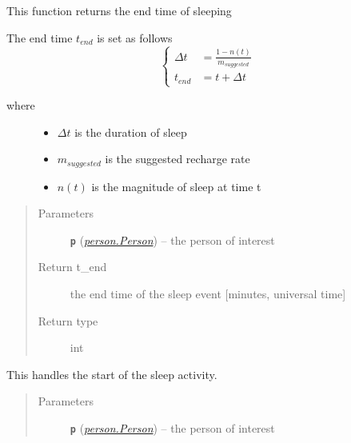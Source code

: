 \documentclass[letterpaper,10pt,english]{sphinxmanual}
\begin{document}
\begin{fulllineitems}
\begin{fulllineitems}
\begin{quote}
\begin{description}
\end{description}\end{quote}

\end{fulllineitems}


\begin{fulllineitems}
\label{sleep:sleep.Sleep.set_end_time}
This function returns the end time of sleeping

The end time \(t_{end}\) is set as follows
\[
\begin{cases}
    \Delta{t} &= \frac{ 1 - n(t) }{ m_{suggested} } \\
    t_{end} &= t + \Delta{t}
\end{cases}
\]\begin{description}
\item[{where}] \leavevmode\begin{itemize}
\item {} 
\(\Delta{t}\) is the duration of sleep

\item {} 
\(m_{suggested}\) is the suggested recharge rate

\item {} 
\(n(t)\) is the magnitude of sleep at time t

\end{itemize}

\end{description}
\begin{quote}\begin{description}
\item[{Parameters}] \leavevmode
\textbf{\texttt{p}} ({\hyperref[person:person.Person]{\emph{\emph{person.Person}}}}) -- the person of interest

\item[{Return t\_end}] \leavevmode
the end time of the sleep event {[}minutes, universal time{]}

\item[{Return type}] \leavevmode
int

\end{description}\end{quote}

\end{fulllineitems}


\begin{fulllineitems}
\label{sleep:sleep.Sleep.start}
This handles the start of the sleep activity.
\begin{quote}\begin{description}
\item[{Parameters}] \leavevmode
\textbf{\texttt{p}} ({\hyperref[person:person.Person]{\emph{\emph{person.Person}}}}) -- the person of interest


\end{description}
\end{quote}
\end{fulllineitems}
\end{fulllineitems}
\end{document}
